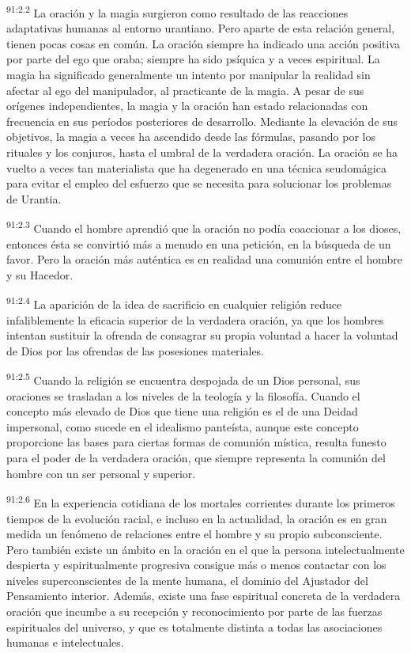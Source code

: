 \par
\textsuperscript{91:2.2} La oración y la magia surgieron como resultado de las reacciones adaptativas humanas al entorno urantiano. Pero aparte de esta relación general, tienen pocas cosas en común. La oración siempre ha indicado una acción positiva por parte del ego que oraba; siempre ha sido psíquica y a veces espiritual. La magia ha significado generalmente un intento por manipular la realidad sin afectar al ego del manipulador, al practicante de la magia. A pesar de sus orígenes independientes, la magia y la oración han estado relacionadas con frecuencia en sus períodos posteriores de desarrollo. Mediante la elevación de sus objetivos, la magia a veces ha ascendido desde las fórmulas, pasando por los rituales y los conjuros, hasta el umbral de la verdadera oración. La oración se ha vuelto a veces tan materialista que ha degenerado en una técnica seudomágica para evitar el empleo del esfuerzo que se necesita para solucionar los problemas de Urantia.

\par
\textsuperscript{91:2.3} Cuando el hombre aprendió que la oración no podía coaccionar a los dioses, entonces ésta se convirtió más a menudo en una petición, en la búsqueda de un favor. Pero la oración más auténtica es en realidad una comunión entre el hombre y su Hacedor.

\par
\textsuperscript{91:2.4} La aparición de la idea de sacrificio en cualquier religión reduce infaliblemente la eficacia superior de la verdadera oración, ya que los hombres intentan sustituir la ofrenda de consagrar su propia voluntad a hacer la voluntad de Dios por las ofrendas de las posesiones materiales.

\par
\textsuperscript{91:2.5} Cuando la religión se encuentra despojada de un Dios personal, sus oraciones se trasladan a los niveles de la teología y la filosofía. Cuando el concepto más elevado de Dios que tiene una religión es el de una Deidad impersonal, como sucede en el idealismo panteísta, aunque este concepto proporcione las bases para ciertas formas de comunión mística, resulta funesto para el poder de la verdadera oración, que siempre representa la comunión del hombre con un ser personal y superior.

\par
\textsuperscript{91:2.6} En la experiencia cotidiana de los mortales corrientes durante los primeros tiempos de la evolución racial, e incluso en la actualidad, la oración es en gran medida un fenómeno de relaciones entre el hombre y su propio subconsciente. Pero también existe un ámbito en la oración en el que la persona intelectualmente despierta y espiritualmente progresiva consigue más o menos contactar con los niveles superconscientes de la mente humana, el dominio del Ajustador del Pensamiento interior. Además, existe una fase espiritual concreta de la verdadera oración que incumbe a su recepción y reconocimiento por parte de las fuerzas espirituales del universo, y que es totalmente distinta a todas las asociaciones humanas e intelectuales.

